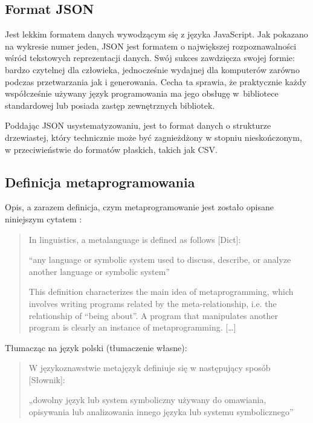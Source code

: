 \documentclass[12pt]{article}
\newcommand{\n}{\newline}
\begin{document}
{		{
			\newpage
			\subsection{Format JSON}

			Jest lekkim formatem danych wywodzącym się z języka JavaScript. Jak pokazano na wykresie numer jeden,
			JSON jest formatem o największej rozpoznawalności wśród tekstowych reprezentacji danych. Swój sukces
			zawdzięcza swojej formie: bardzo czytelnej dla człowieka, jednocześnie wydajnej dla komputerów zarówno
			podczas przetwarzania jak i generowania. Cecha ta sprawia, że praktycznie każdy współcześnie używany język
			programowania ma jego obsługę\cite{json_short} w~bibliotece standardowej lub posiada zastęp zewnętrznych
			bibliotek.\n

			Poddając JSON usystematyzowaniu, jest to format danych o strukturze drzewiastej, który technicznie
			może być zagnieżdżony w stopniu nieskończonym, w przeciwieństwie do formatów płaskich, takich jak CSV.\n
		}

		{
			\subsection{Definicja metaprogramowania}

			Opis, a zarazem definicja, czym metaprogramowanie jest zostało opisane niniejszym cytatem \cite{metaprogramming_definition}:

			\begin{quotation}
					In linguistics, a metalanguage is defined as follows [Dict]:\n

				“any language or symbolic system used to discuss, describe, or analyze another
					language or symbolic system”\n

					This definition characterizes the main idea of metaprogramming, which involves writing
				programs related by the meta-relationship, i.e. the relationship of “being about”. A program that
				manipulates another program is clearly an instance of metaprogramming. [\ldots]
			\end{quotation}

			\newpage
			{\noindent Tłumacząc na język polski (tłumaczenie własne):}

			\begin{quotation}
					W językoznawstwie metajęzyk definiuje się w następujący sposób [Słownik]:\n

				„dowolny język lub system symboliczny używany do omawiania, opisywania lub analizowania
					innego języka lub systemu symbolicznego”\n


\end{quotation}}}
\end{document}
